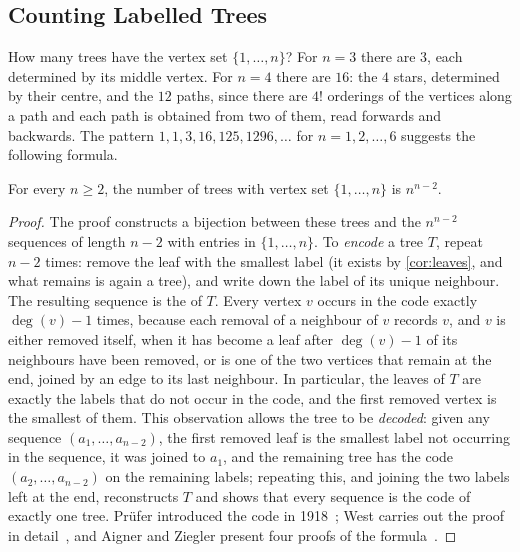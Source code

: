 \subsection{Counting Labelled Trees}

How many trees have the vertex set $\{1,\ldots,n\}$? For $n=3$ there are $3$, each determined by its middle vertex. For $n=4$ there are $16$: the $4$ stars, determined by their centre, and the $12$ paths, since there are $4!$ orderings of the vertices along a path and each path is obtained from two of them, read forwards and backwards. The pattern $1,1,3,16,125,1296,\ldots$ for $n=1,2,\ldots,6$ suggests the following formula.

\begin{theorem}
\label{thm:cayley}
For every $n\ge2$, the number of trees with vertex set $\{1,\ldots,n\}$ is $n^{n-2}$.
\end{theorem}

\begin{proof}
The proof constructs a bijection between these trees and the $n^{n-2}$ sequences of length $n-2$ with entries in $\{1,\ldots,n\}$. To \emph{encode} a tree $T$, repeat $n-2$ times: remove the leaf with the smallest label (it exists by \cref{cor:leaves}, and what remains is again a tree), and write down the label of its unique neighbour. The resulting sequence is the  of $T$. Every vertex $v$ occurs in the code exactly $\deg(v)-1$ times, because each removal of a neighbour of $v$ records $v$, and $v$ is either removed itself, when it has become a leaf after $\deg(v)-1$ of its neighbours have been removed, or is one of the two vertices that remain at the end, joined by an edge to its last neighbour. In particular, the leaves of $T$ are exactly the labels that do not occur in the code, and the first removed vertex is the smallest of them. This observation allows the tree to be \emph{decoded}: given any sequence $(a_1,\ldots,a_{n-2})$, the first removed leaf is the smallest label not occurring in the sequence, it was joined to $a_1$, and the remaining tree has the code $(a_2,\ldots,a_{n-2})$ on the remaining labels; repeating this, and joining the two labels left at the end, reconstructs $T$ and shows that every sequence is the code of exactly one tree. Pr\"ufer introduced the code in 1918~\cite{prufer1918}; West carries out the proof in detail~\cite[Sect.~2.2]{west2001}, and Aigner and Ziegler present four proofs of the formula~\cite{aigner2018proofs}.
\end{proof}

